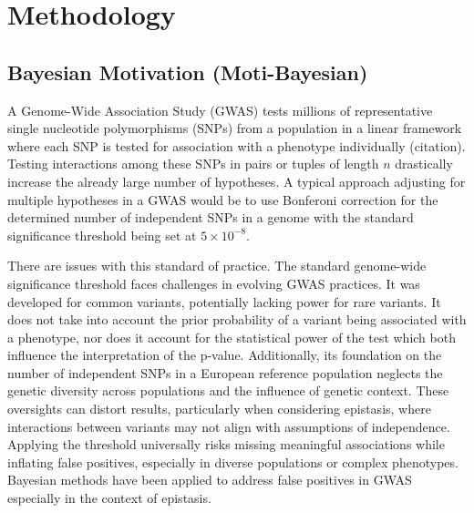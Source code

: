 \documentclass{article}\usepackage[]{graphicx}\usepackage[]{color}
\begin{document}

\section{Methodology}
\subsection{Bayesian Motivation (Moti-Bayesian)}
A Genome-Wide Association Study (GWAS) tests millions of representative single nucleotide polymorphisms (SNPs) from a population in a linear framework where each SNP is tested for association with a phenotype individually (citation). Testing interactions among these SNPs in pairs or tuples of length $n$ drastically increase the already large number of hypotheses. A typical approach adjusting for multiple hypotheses in a GWAS would be to use Bonferoni correction for the determined number of independent SNPs in a genome with the standard significance threshold being set at $5\times 10^{-8}$. 
\par 
There are issues with this standard of practice. The standard genome-wide significance threshold faces challenges in evolving GWAS practices. It was developed for common variants, potentially lacking power for rare variants. It does not take into account the prior probability of a variant being associated with a phenotype, nor does it account for the statistical power of the test which both influence the interpretation of the p-value. Additionally, its foundation on the number of independent SNPs in a European reference population neglects the genetic diversity across populations and the influence of genetic context. These oversights can distort results, particularly when considering epistasis, where interactions between variants may not align with assumptions of independence. Applying the threshold universally risks missing meaningful associations while inflating false positives, especially in diverse populations or complex phenotypes. Bayesian methods have been applied to address false positives in GWAS especially in the context of epistasis.
\end{document}

